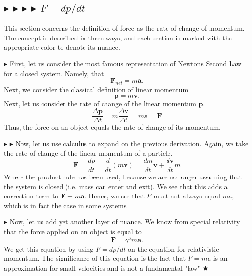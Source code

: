 \subsection{\color{OrangeRed} $\blacktriangleright$ \color{PineGreen} $\blacktriangleright$ \color{Goldenrod} $\blacktriangleright$ \color{Orchid} $\blacktriangleright$ \color{black} $F=dp/dt$}
\noindent This section concerns the definition of force as the rate of change of momentum. The concept is described in three ways, and each section is marked with the appropriate color to denote its nuance.

\noindent \color{OrangeRed} $\blacktriangleright$ \color{black} First, let us consider the most famous representation of Newtons Second Law for a closed system. Namely, that 
\begin{equation}
    \mathbf{F}_{net}=m\mathbf{a}.
\end{equation}
\noindent Next, we consider the classical definition of linear momentum
\begin{equation}
    \mathbf{p} = m\mathbf{v}.
\end{equation}
\noindent Next, let us consider the rate of change of the linear momentum $\mathbf{p}$.
\begin{equation}
    \frac{\Delta \mathbf{p}}{\Delta t} = m \frac{\Delta \mathbf{v}}{\Delta t} = m\mathbf{a} = \mathbf{F}
\end{equation}
\noindent Thus,  the force on an object equals the rate of change of its momentum.

\noindent \color{PineGreen} $\blacktriangleright$ \color{Goldenrod} $\blacktriangleright$ \color{black} Now, let us use calculus to expand on the previous derivation. Again, we take the rate of change of the linear momentum of a particle.
\begin{equation}
    \mathbf{F} = \frac{dp}{dt} = \frac{d}{dt}(m\mathbf{v}) = \frac{dm}{dt}\mathbf{v} + \frac{d\mathbf{v}}{dt}m
\end{equation}
\noindent Where the product rule has been used, because we are no longer assuming that the system is closed (i.e. mass can enter and exit). We see that this adds a correction term to $\mathbf{F}=m\mathbf{a}$. Hence, we see that $F$ must not always equal $ma$, which is in fact the case in some systems.

\noindent \color{Orchid} $\blacktriangleright$ \color{black} Now, let us add yet another layer of nuance. We know from special relativity that the force applied on an object is equal to 
\begin{equation}
    \mathbf{F} = \gamma^3m\mathbf{a}.
\end{equation}
\noindent We get this equation by using $F=dp/dt$ on the equation for relativistic momentum. The significance of this equation is the fact that $F=ma$ is an approximation for small velocities and is not a fundamental "law"  $\bigstar$

